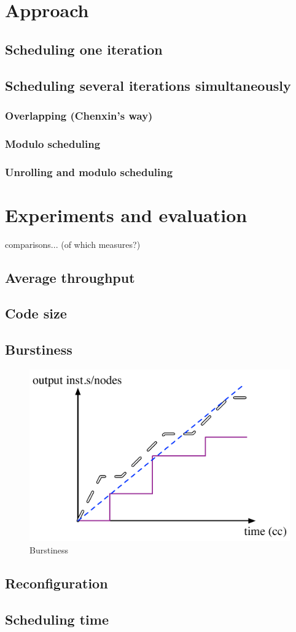 \section{Approach}
\subsection{Scheduling one iteration}
\subsection{Scheduling several iterations simultaneously}
\subsubsection{Overlapping (Chenxin's way)}
\subsubsection{Modulo scheduling}
\subsubsection{Unrolling and modulo scheduling}

\section{Experiments and evaluation}
comparisons... (of which measures?)

\subsection{Average throughput}
\subsection{Code size}
\subsection{Burstiness}
\begin{figure}[h]
\centering
\includegraphics[width=\linewidth]{burstiness}
\caption{Burstiness}
\end{figure}

\subsection{Reconfiguration}
\subsection{Scheduling time}
